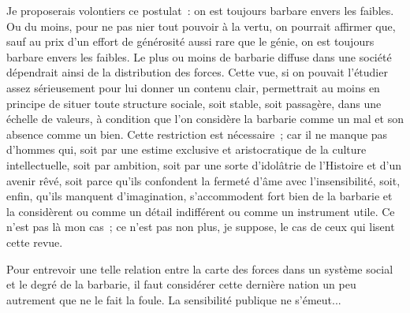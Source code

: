 \documentclass[french,twoside]{book} %
\begin{document}
Je proposerais volontiers ce postulat : on est toujours barbare envers les faibles. Ou du moins, pour ne pas nier tout pouvoir à la vertu, on pourrait affirmer que, sauf au prix d'un effort de générosité aussi rare que le génie, on est toujours barbare envers les faibles. Le plus ou moins de barbarie diffuse dans une société dépendrait ainsi de la distribution des forces. Cette vue, si on pouvait l'étudier assez sérieusement pour lui donner un contenu clair, permet­trait au moins en principe de situer toute structure sociale, soit stable, soit passagère, dans une échelle de valeurs, à condition que l'on considère la barbarie comme un mal et son absence comme un bien. Cette restriction est nécessaire ; car il ne manque pas d'hommes qui, soit par une estime exclusive et aristocratique de la culture intellectuelle, soit par ambition, soit par une sorte d'idolâtrie de l'Histoire et d'un avenir rêvé, soit parce qu'ils confondent la fermeté d'âme avec l'insensibilité, soit, enfin, qu'ils manquent d'imagination, s'accommodent fort bien de la barbarie et la considèrent ou comme un détail indifférent ou comme un instrument utile. Ce n'est pas là mon cas ; ce n'est pas non plus, je suppose, le cas de ceux qui lisent cette revue.\par
\par
Pour entrevoir une telle relation entre la carte des forces dans un système social et le degré de la barbarie, il faut considérer cette dernière nation un peu autrement que ne le fait la foule. La sensibilité publique ne s'émeut...\par
\end{document}
